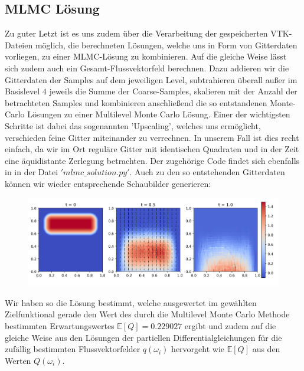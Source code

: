 \subsection{MLMC Lösung}
Zu guter Letzt ist es uns zudem über die Verarbeitung der gespeicherten VTK-Dateien möglich, die berechneten Lösungen, welche uns in Form von Gitterdaten vorliegen, zu einer MLMC-Lösung zu kombinieren. Auf die gleiche Weise lässt sich zudem auch ein Gesamt-Flussvektorfeld berechnen. Dazu addieren wir die Gitterdaten der Samples auf dem jeweiligen Level, subtrahieren überall außer im Basislevel $ 4 $ jeweils die Summe der Coarse-Samples, skalieren mit der Anzahl der betrachteten Samples und kombinieren anschließend die so entstandenen Monte-Carlo Lösungen zu einer Multilevel Monte Carlo Lösung.
Einer der wichtigsten Schritte ist dabei das sogenannten 'Upscaling', welches uns ermöglicht, verschieden feine Gitter miteinander zu verrechnen. In unserem Fall ist dies recht einfach, da wir im Ort reguläre Gitter mit identischen Quadraten und in der Zeit eine äquidistante Zerlegung betrachten. Der zugehörige Code findet sich ebenfalls in \cite{githubvtk} in der Datei $'mlmc\_solution.py'$.
Auch zu den so entstehenden Gitterdaten können wir wieder entsprechende Schaubilder generieren:
\begin{figure}[H]
	\centering
	\includegraphics[width=\textwidth]{plots/mlmc.png} 
\end{figure}
Wir haben so die Lösung bestimmt, welche ausgewertet im gewählten Zielfunktional gerade den Wert des durch die Multilevel Monte Carlo Methode bestimmten Erwartungswertes
$ \mathbb{E}[Q] = 0.229027 $ ergibt und zudem auf die gleiche Weise aus den Lösungen der partiellen Differentialgleichungen für die zufällig bestimmten Flussvektorfelder $ q(\omega_i) $ hervorgeht wie $ \mathbb{E}[Q] $ aus den Werten $ Q(\omega_i) $.


